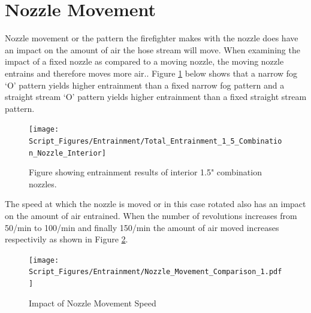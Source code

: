 \documentclass[12pt,oneside]{book}
\begin{document}


\section{Nozzle Movement}
Nozzle movement or the pattern the firefighter makes with the nozzle does have an impact on the amount of air the hose stream will move. When examining the impact of a fixed nozzle as compared to a moving nozzle, the moving nozzle entrains and therefore moves more air..  Figure \ref{fig:1_5_Interior_Combination_Results_Nozzle_Movements} below shows that a narrow fog `O' pattern yields higher entrainment than a fixed narrow fog pattern and a straight stream `O' pattern yields higher entrainment than a fixed straight stream pattern. 

\begin{figure}[!ht]
	\centering
	\texttt{[image: Script\_Figures/Entrainment/Total\_Entrainment\_1\_5\_Combination\_Nozzle\_Interior]}
	\caption{Figure showing entrainment results of interior 1.5" combination nozzles.}
	\label{fig:1_5_Interior_Combination_Results_Nozzle_Movements}
\end{figure}

The speed at which the nozzle is moved or in this case rotated also has an impact on the amount of air entrained. When the number of revolutions increases from 50/min to 100/min and finally 150/min the amount of air moved increases respectivily as shown in Figure \ref{fig:Nozzle_Move_1}.

\begin{figure}[!ht]
\centering
\texttt{[image: Script\_Figures/Entrainment/Nozzle\_Movement\_Comparison\_1.pdf]}
\caption{Impact of Nozzle Movement Speed}
\label{fig:Nozzle_Move_1}
\end{figure}
\end{document}
